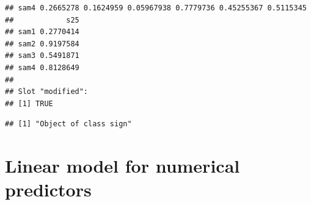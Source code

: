 \documentclass{article}
\begin{document}
\begin{knitrout}
\begin{kframe}
\begin{verbatim}
## sam4 0.2665278 0.1624959 0.05967938 0.7779736 0.45255367 0.5115345
##            s25
## sam1 0.2770414
## sam2 0.9197584
## sam3 0.5491871
## sam4 0.8128649
## 
## Slot "modified":
## [1] TRUE
\end{verbatim}
\begin{alltt}
 \hlkwb{<-} \hlstd{(}
\hlopt{$}
\end{alltt}
\begin{verbatim}
## [1] "Object of class sign"
\end{verbatim}
\end{kframe}
\end{knitrout}

\section{Linear model for numerical predictors}
\end{document}
